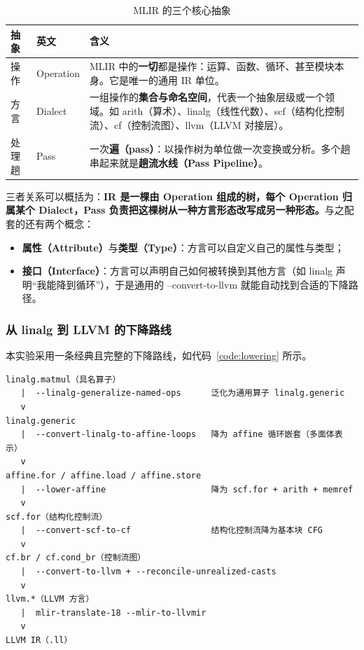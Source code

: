 \documentclass[UTF8,a4paper,10pt]{ctexart}
\newcommand{\headcol}{\bfseries}
\begin{document}
\begin{table}[H]
  \centering
  \small
  \setlength{\tabcolsep}{4pt}
  \begin{tabular}{>{\centering\arraybackslash}p{1.8cm}>{\centering\arraybackslash}p{2.2cm}>{\centering\arraybackslash}p{10.6cm}}
    \toprule
\headcol 抽象 & \headcol 英文 & \headcol 含义 \\
    \midrule
操作 & Operation & MLIR 中的\textbf{一切}都是操作：运算、函数、循环、甚至模块本身。它是唯一的通用 IR 单位。 \\
    方言 & Dialect & 一组操作的\textbf{集合与命名空间}，代表一个抽象层级或一个领域。如 arith（算术）、linalg（线性代数）、scf（结构化控制流）、cf（控制流图）、llvm（LLVM 对接层）。 \\
    处理趟 & Pass & 一次\textbf{遍（pass）}：以操作树为单位做一次变换或分析。多个趟串起来就是\textbf{趟流水线（Pass Pipeline）}。 \\
    \bottomrule
\end{tabular}
  \caption{MLIR 的三个核心抽象}
  \label{tab:mlirabstract}
\end{table}

三者关系可以概括为：\textbf{IR 是一棵由 Operation 组成的树，每个 Operation 归属某个 Dialect，Pass 负责把这棵树从一种方言形态改写成另一种形态。}与之配套的还有两个概念：

\begin{itemize}
  \item \textbf{属性（Attribute）}与\textbf{类型（Type）}：方言可以自定义自己的属性与类型；
  \item \textbf{接口（Interface）}：方言可以声明自己如何被转换到其他方言（如 linalg 声明“我能降到循环”），于是通用的 --convert-to-llvm 就能自动找到合适的下降路径。
\end{itemize}

\subsubsection{从 linalg 到 LLVM 的下降路线}

本实验采用一条经典且完整的下降路线，如代码~\ref{code:lowering} 所示。

\begin{lstlisting}[label=code:lowering]
linalg.matmul（具名算子）
   |  --linalg-generalize-named-ops      泛化为通用算子 linalg.generic
   v
linalg.generic
   |  --convert-linalg-to-affine-loops   降为 affine 循环嵌套（多面体表示）
   v
affine.for / affine.load / affine.store
   |  --lower-affine                     降为 scf.for + arith + memref
   v
scf.for（结构化控制流）
   |  --convert-scf-to-cf                结构化控制流降为基本块 CFG
   v
cf.br / cf.cond_br（控制流图）
   |  --convert-to-llvm + --reconcile-unrealized-casts
   v
llvm.*（LLVM 方言）
   |  mlir-translate-18 --mlir-to-llvmir
   v
LLVM IR（.ll）
\end{lstlisting}
\end{document}

